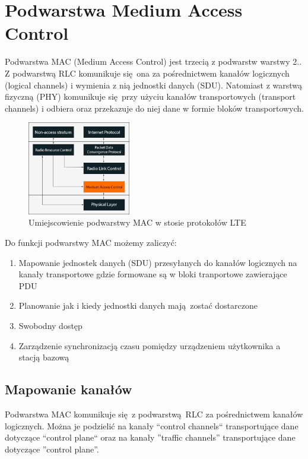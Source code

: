 \chapter{Podwarstwa Medium Access Control}
\label{cha:mac}

Podwarstwa MAC (Medium Access Control) jest trzecią z podwarstw warstwy 2.. Z podwarstwą RLC komunikuje się ona za pośrednictwem kanałów logicznych (logical channels) i wymienia z nią jednostki danych (SDU). Natomiast z warstwą fizyczną (PHY) komunikuje się przy użyciu kanałów transportowych (transport channels) i odbiera oraz przekazuje do niej dane w formie bloków transportowych. \cite{Cox14}

\begin{figure}
	\centerline{\includegraphics[width=0.4\textwidth]{images/mac_overview.png}}
	\caption{Umiejscowienie podwarstwy MAC w stosie protokołów LTE}
	\label{fig:mac_overview}
\end{figure}

Do funkcji podwarstwy MAC możemy zaliczyć:

\begin{enumerate} 
	\item Mapowanie jednostek danych (SDU) przesyłanych do kanałów logicznych na kanały transportowe gdzie formowane są w bloki tranportowe zawierające PDU
	\item Planowanie jak i kiedy jednostki danych mają zostać dostarczone
	\item Swobodny dostęp
	\item Zarządzenie synchronizacją czasu pomiędzy urządzeniem użytkownika a stacją bazową 
\end{enumerate}

\section{Mapowanie kanałów}

Podwarstwa MAC komunikuje się z podwarstwą RLC za pośrednictwem kanałów logicznych. Można je podzielić na kanały ``control channels`` transportujące dane dotyczące ``control plane`` oraz na kanały ''traffic channels'' transportujące dane dotyczące ''control plane''.

